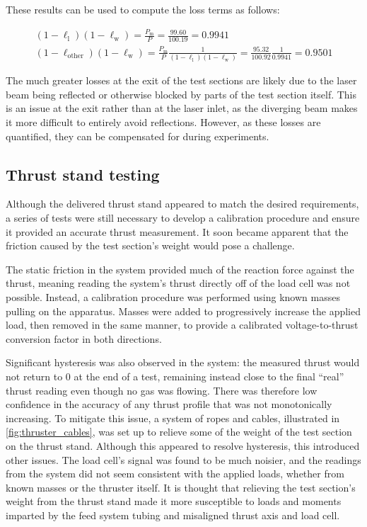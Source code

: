                 These results can be used to compute the loss terms as follows:

                \begin{gather*}
                    (1-\ell_\mathrm{l})(1-\ell_\mathrm{w}) = \frac{P_\mathrm{m}}{P} = \frac{99.60}{100.19} = 0.9941 \\
                    (1-\ell_\mathrm{other})(1-\ell_\mathrm{w}) = \frac{P_\mathrm{m}}{P}\frac{1}{(1-\ell_\mathrm{l})(1-\ell_\mathrm{w})} = \frac{95.32}{100.92}\frac{1}{0.9941} = 0.9501
                \end{gather*}
                
                The much greater losses at the exit of the test sections are likely due to the laser beam being reflected or otherwise blocked by parts of the test section itself. This is an issue at the exit rather than at the laser inlet, as the diverging beam makes it more difficult to entirely avoid reflections. However, as these losses are quantified, they can be compensated for during experiments.

        \subsection{Thrust stand testing} \label{sec:ts_testing}
                Although the delivered thrust stand appeared to match the desired requirements, a series of tests were still necessary to develop a calibration procedure and ensure it provided an accurate thrust measurement. It soon became apparent that the friction caused by the test section's weight would pose a challenge.
                
                The static friction in the system provided much of the reaction force against the thrust, meaning reading the system's thrust directly off of the load cell was not possible. Instead, a calibration procedure was performed using known masses pulling on the apparatus. Masses were added to progressively increase the applied load, then removed in the same manner, to provide a calibrated voltage-to-thrust conversion factor in both directions.
                
                Significant hysteresis was also observed in the system: the measured thrust would not return to 0 at the end of a test, remaining instead close to the final ``real'' thrust reading even though no gas was flowing. There was therefore low confidence in the accuracy of any thrust profile that was not monotonically increasing. To mitigate this issue, a system of ropes and cables, illustrated in \autoref{fig:thruster_cables}, was set up to relieve some of the weight of the test section on the thrust stand. Although this appeared to resolve hysteresis, this introduced other issues. The load cell's signal was found to be much noisier, and the readings from the system did not seem consistent with the applied loads, whether from known masses or the thruster itself. It is thought that relieving the test section's weight from the thrust stand made it more susceptible to loads and moments imparted by the feed system tubing and misaligned thrust axis and load cell.

